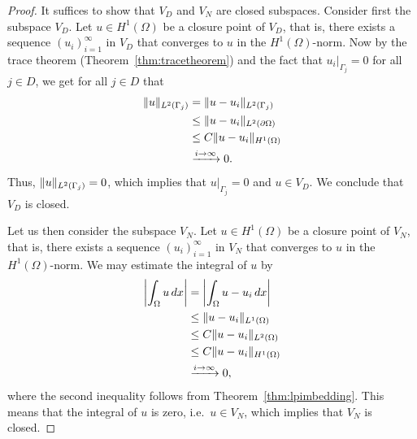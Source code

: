 \documentclass[english, 12pt, a4paper, sci, utf8, a-2b, online]{aaltothesis}
\theoremstyle{definition}
\theoremstyle{plain}
\DeclarePairedDelimiter\abs{\lvert}{\rvert}
\DeclarePairedDelimiter\norm{\lVert}{\rVert}
\newcommand*\diff{\mathop{}\!d}
\numberwithin{equation}{section}
\begin{document}
\begin{proof}
    It suffices to show that $V_D$ and $V_N$ are closed subspaces.
    Consider first the subspace $V_D$.
    Let $u \in H^1(\Omega)$ be a closure point of $V_D$, that is,
    there exists a sequence $(u_i)_{i=1}^{\infty}$ in $V_D$ that converges
    to $u$ in the $H^1(\Omega)$-norm. Now by the trace theorem (Theorem~\ref{thm:tracetheorem})
    and the fact that $u_i|_{\Gamma_j} = 0$ for all $j \in D$, we get for all $j \in D$ that
    \begin{align*}
        \norm{u}_{L^2(\Gamma_j)}
        &= \norm{u - u_i}_{L^2(\Gamma_j)} \\
        &\leq \norm{u - u_i}_{L^2(\partial \Omega)} \\
        &\leq C \norm{u - u_i}_{H^1(\Omega)} \\
        &\xrightarrow[]{i \to \infty} 0.
    \end{align*}
    Thus, $\norm{u}_{L^2(\Gamma_j)} = 0$, which implies that
    $u|_{\Gamma_j} = 0$ and $u \in V_D$.
    We conclude that $V_D$ is closed.

    Let us then consider the subspace $V_N$.
    Let $u \in H^1(\Omega)$ be a closure point of $V_N$, that is,
    there exists a sequence $(u_i)_{i=1}^{\infty}$ in $V_N$ that converges
    to $u$ in the $H^1(\Omega)$-norm.
    We may estimate the integral of $u$ by
    \begin{align*}
        \abs*{\int_{\Omega} u \diff x}
        &= \abs*{\int_{\Omega} u - u_i \diff x} \\
        &\leq \norm{u - u_i}_{L^1(\Omega)} \\
        &\leq C \norm{u - u_i}_{L^2(\Omega)} \\
        &\leq C \norm{u - u_i}_{H^1(\Omega)} \\
        &\xrightarrow[]{i \to \infty} 0,
    \end{align*}
    where the second inequality follows from Theorem~\ref{thm:lpimbedding}.
    This means that the integral of $u$ is zero, i.e.\ $u \in V_N$,
    which implies that $V_N$ is closed.
\end{proof}
\end{document}
